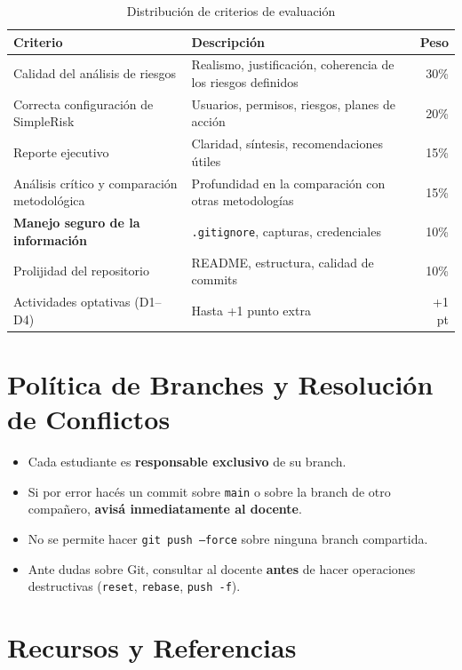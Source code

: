\documentclass[11pt,a4paper]{article}
\begin{document}
\begin{table}[h!]
\centering
\renewcommand{\arraystretch}{1.3}
\begin{tabularx}{\textwidth}{@{}lXr@{}}
\toprule
\textbf{Criterio} & \textbf{Descripción} & \textbf{Peso} \\
\midrule
Calidad del análisis de riesgos & Realismo, justificación, coherencia de los riesgos definidos & 30\% \\
Correcta configuración de SimpleRisk & Usuarios, permisos, riesgos, planes de acción & 20\% \\
Reporte ejecutivo & Claridad, síntesis, recomendaciones útiles & 15\% \\
Análisis crítico y comparación metodológica & Profundidad en la comparación con otras metodologías & 15\% \\
\textbf{Manejo seguro de la información} & \texttt{.gitignore}, capturas, credenciales & 10\% \\
Prolijidad del repositorio & README, estructura, calidad de commits & 10\% \\
Actividades optativas (D1--D4) & Hasta +1 punto extra & +1 pt \\
\bottomrule
\end{tabularx}
\caption{Distribución de criterios de evaluación}
\end{table}

\section{Política de Branches y Resolución de Conflictos}

\begin{itemize}
    \item Cada estudiante es \textbf{responsable exclusivo} de su branch.
    \item Si por error hacés un commit sobre \texttt{main} o sobre la branch de otro compañero, \textbf{avisá inmediatamente al docente}.
    \item No se permite hacer \texttt{git push --force} sobre ninguna branch compartida.
    \item Ante dudas sobre Git, consultar al docente \textbf{antes} de hacer operaciones destructivas (\texttt{reset}, \texttt{rebase}, \texttt{push -f}).
\end{itemize}

\section{Recursos y Referencias}
\end{document}
